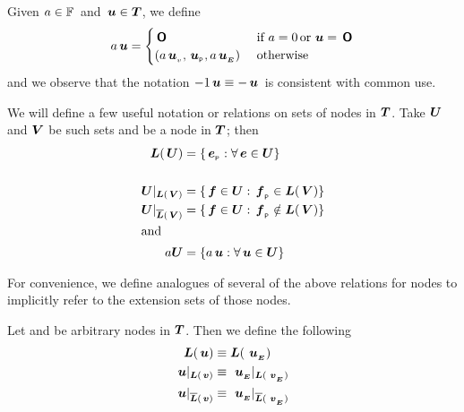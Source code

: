 \begin{definition}
  Given \(a \in \FIELD\)\ and \(\node{u} \in \DOM\), we
  define
  \begin{align*}
      a \node{u} = \begin{cases}
        \zerotree  & \text{ if } a = 0 \mor \node{u} = \zerotree \\
        (a \nv{u}, \nlabel{u}, a\extn{u}) & \text{ otherwise }
      \end{cases}
  \end{align*}
  and we observe that the notation \(-1 \node{u} \equiv  -\node{u}\)\ is
  consistent with common use.
\end{definition}

\begin{definition}\label{useful-set-functions}
  We will define a few useful notation or relations on sets of nodes
  in $\DOM$. Take \(\set{U}\) and \(\set{V}\) be such sets and
   be a node in $\DOM$; then 
  \begin{align*}
      \nlabels{U} &= \{\nlabel{e}: \forall \node{e} \in \set{U}\} \notag\\
      & \notag\\
      \srestrictedto{U}{V} &= \{\node{f} \in \set{U}: \nlabel{f} \in \nlabels{V} \} \notag\\
      \nsrestrictedto{U}{V} &= \{ \node{f} \in \set{U}: \nlabel{f} \notin \nlabels{V} \} \label{restrictions}\notag\\
      \intertext{and}
      a \set{U} &= \{a \node{u}: \forall \node{u} \in \set{U}\} \notag
  \end{align*}
\end{definition}


\begin{definition}\label{useful-node-functions}
  For convenience, we define analogues of several of the above
  relations for nodes to implicitly refer to the extension sets of
  those nodes.

  Let  and  be arbitrary nodes in $\DOM$.  Then we
  define the following
  \begin{align*}
      \nlabels{u} &\equiv \nlabels{\extn{u}}\\
      \restrictedto{u}{v} &\equiv \restrictedto{\extn{u}}{\extn{v}}\\
      \nrestrictedto{u}{v} &\equiv \nrestrictedto{\extn{u}}{\extn{v}}
  \end{align*}
\end{definition}

